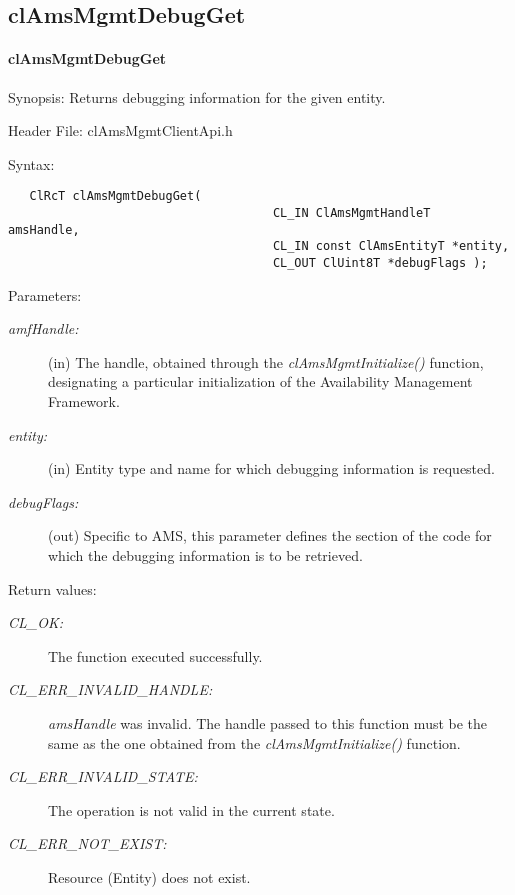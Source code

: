 \subsection{clAmsMgmtDebugGet}
\hypertarget{pageams127}{}\paragraph{cl\-Ams\-Mgmt\-Debug\-Get}\label{pageams127}
\begin{Desc}
\item[Synopsis:]Returns debugging information for the given entity.\end{Desc}
\begin{Desc}
\item[Header File:]clAmsMgmtClientApi.h\end{Desc}
\begin{Desc}
\item[Syntax:]

\footnotesize\begin{verbatim}   ClRcT clAmsMgmtDebugGet(
                               		 CL_IN ClAmsMgmtHandleT  amsHandle,
                               		 CL_IN const ClAmsEntityT *entity,
                               		 CL_OUT ClUint8T *debugFlags );
\end{verbatim}
\normalsize
\end{Desc}
\begin{Desc}
\item[Parameters:]
\begin{description}
\item[{\em amf\-Handle:}](in) The handle, obtained through the \textit{clAmsMgmtInitialize()} function, designating a particular initialization of the
Availability Management Framework. \item[{\em entity:}](in) Entity type and name for which debugging information is requested. \item[{\em debug\-Flags:}](out) Specific to AMS, this parameter defines the section of the code for which the debugging information is to be retrieved.\end{description}
\end{Desc}
\begin{Desc}
\item[Return values:]
\begin{description}
\item[{\em CL\_\-OK:}]The function executed successfully. \item[{\em CL\_\-ERR\_\-INVALID\_\-HANDLE:}]{\em ams\-Handle\/} was invalid. 
The handle passed to this function must be the same as the one obtained from the \textit{clAmsMgmtInitialize()} function. 
\item[{\em CL\_\-ERR\_\-INVALID\_\-STATE:}]The operation is not valid in the current state. \item[{\em CL\_\-ERR\_\-NOT\_\-EXIST:}]Resource (Entity) does not exist.\end{description}
\end{Desc}
